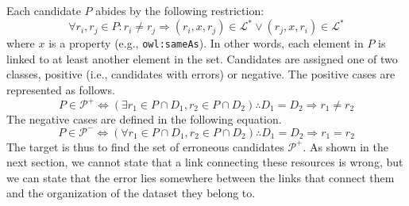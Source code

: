 Each candidate $P$ abides by the following restriction:
\begin{equation} \label{eq:cand} %
\forall r_i,r_j \in P : r_i \neq r_j \Rightarrow (r_i, x, r_j) \in \mathcal{L}^* \vee (r_j, x, r_i) \in \mathcal{L}^*
\end{equation}
where $x$ is a property (e.g., \texttt{owl:sameAs}).
In other words, each element in $P$ is linked to at least another element in the set.
Candidates are assigned one of two classes, positive (i.e., candidates with errors) or negative.
The positive cases are represented as follows.
\begin{equation} \label{eq:f1}
P \in \mathcal{P}^+ \iff \left(\exists r_1 \in P \cap D_1, r_2 \in P \cap D_2 \right) \therefore D_1 = D_2 \Rightarrow r_1 \neq r_2
\end{equation} 
The negative cases are defined in the following equation.
\begin{equation} \label{eq:negativeF1}
P \in \mathcal{P}^- \iff \left(\forall r_1 \in P \cap D_1, r_2 \in P \cap D_2 \right) \therefore D_1 = D_2 \Rightarrow r_1 = r_2
\end{equation} 
The target is thus to find the set of erroneous candidates $\mathcal{P}^+$.
As shown in the next section, we cannot state that a link connecting these resources is wrong, but we can state that the error lies somewhere between the links that connect them and the organization of the dataset they belong to.




